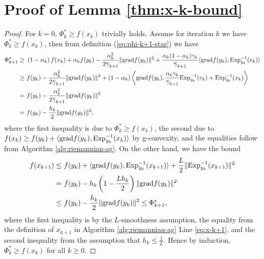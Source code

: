 \section{Proof of Lemma \ref{thm:x-k-bound}} \label{prf:x-k-bound}
\begin{proof}
	For $k=0$, $\Phi_k^*\ge f(x_k)$ trivially holds. Assume for iteration $k$ we have $\Phi_k^*\ge f(x_k)$, then from definition (\ref{eq:phi-k+1-star}) we have
	\begin{align*}
	\Phi_{k+1}^* \ge &~ \left(1 - \alpha_k\right) f(x_k) + \alpha_k f(y_k) - \frac{\alpha_k^2}{2\overline{\gamma}_{k+1}}\|\mathrm{grad} f(y_k)\|^2 + \frac{\alpha_k(1-\alpha_k)\gamma_k}{\overline{\gamma}_{k+1}}\langle \mathrm{grad} f(y_k), \mathrm{Exp}_{y_k}^{-1}(v_k)\rangle \\
	\ge &~ f(y_k) - \frac{\alpha_k^2}{2\overline{\gamma}_{k+1}}\|\mathrm{grad} f(y_k)\|^2 + (1-\alpha_k)\left\langle \mathrm{grad} f(y_k), \frac{\alpha_k\gamma_k}{\overline{\gamma}_{k+1}}\mathrm{Exp}_{y_k}^{-1}(v_k) + \mathrm{Exp}_{y_k}^{-1}(x_k)\right\rangle \\
	= &~ f(y_k) - \frac{\alpha_k^2}{2\overline{\gamma}_{k+1}}\|\mathrm{grad} f(y_k)\|^2 \\
	= &~ f(y_k) - \frac{h_k}{2}\|\mathrm{grad} f(y_k)\|^2,
	\end{align*}
	where the first inequality is due to $\Phi_k^*\ge f(x_k)$, the second due to $f(x_k)\ge f(y_k) + \langle\mathrm{grad} f(y_k), \mathrm{Exp}_{y_k}^{-1}(x_k)\rangle$ by g-convexity, and the equalities follow from Algorithm \ref{alg:riemannian-ag}. On the other hand, we have the bound
	\begin{align*}
	f(x_{k+1}) \le &~ f(y_k) + \langle\mathrm{grad} f(y_k), \mathrm{Exp}_{y_k}^{-1}(x_{k+1})\rangle + \frac{L}{2}\|\mathrm{Exp}_{y_k}^{-1}(x_{k+1})\|^2 \\
	= &~ f(y_k) - h_k\left(1 - \frac{L h_k}{2}\right)\|\mathrm{grad} f(y_k)\|^2 \\
	\le &~ f(y_k) - \frac{h_k}{2}\|\mathrm{grad} f(y_k)\|^2 \le \Phi_{k+1}^*,
	\end{align*}
	where the first inequality is by the $L$-smoothness assumption, the equality from the definition of $x_{k+1}$ in Algorithm \ref{alg:riemannian-ag} Line \ref{eq:x-k+1}, and the second inequality from the assumption that $h_k\le \frac{1}{L}$. Hence by induction, $\Phi_k^*\ge f(x_k)$ for all $k\ge 0$. 
\end{proof}

